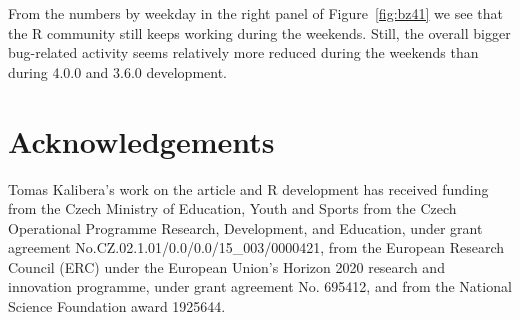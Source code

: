 From the numbers by weekday in the right panel of Figure~\ref{fig:bz41} we
see that the R community still keeps working during the weekends.  Still,
the overall bigger bug-related activity seems relatively more reduced during
the weekends than during 4.0.0 and 3.6.0 development.


\section{Acknowledgements}
Tomas Kalibera's work on the article and R development has received funding
from the Czech Ministry of Education, Youth and Sports from the Czech
Operational Programme Research, Development, and Education, under grant
agreement No.CZ.02.1.01/0.0/0.0/15\_003/0000421, from the European Research
Council (ERC) under the European Union’s Horizon 2020 research and
innovation programme, under grant agreement No.  695412, and from the
National Science Foundation award 1925644.

\begin{samepage}
\address{Tomas Kalibera \\
  Czech Technical University, Czech Republic \\
  }

\address{Sebastian Meyer \\
  Friedrich-Alexander-Universit\"at Erlangen-N\"urnberg, Germany \\
  }

\address{Kurt Hornik \\
  WU Wirtschaftsuniversit\"at Wien, Austria \\
  }
\end{samepage}
